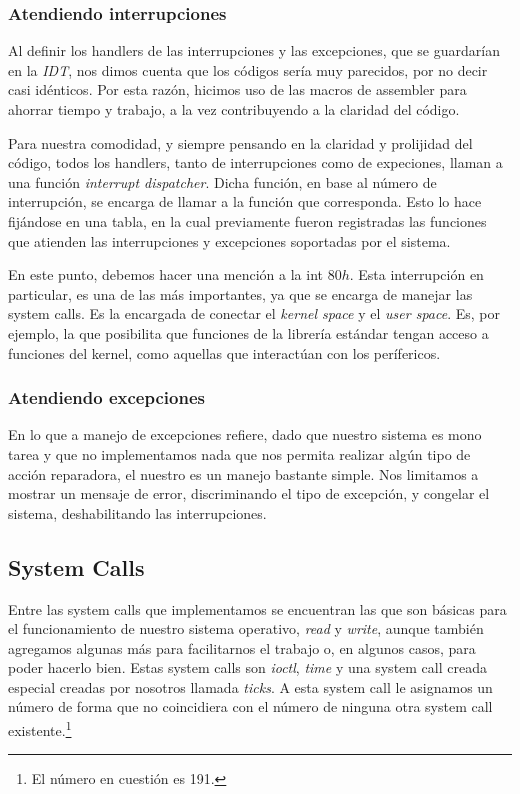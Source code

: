 \documentclass[a4paper,10pt]{article}
\begin{document}
        \subsubsection{Atendiendo interrupciones}
            Al definir los handlers de las interrupciones y las excepciones, que se guardarían en la \textit{IDT}, nos dimos cuenta que los códigos sería muy parecidos,
            por no decir casi idénticos. Por esta razón, hicimos uso de las macros de assembler para ahorrar tiempo y trabajo, a la vez
            contribuyendo a la claridad del código.
            
            Para nuestra comodidad, y siempre pensando en la claridad y prolijidad del código, todos los handlers, tanto de interrupciones
            como de expeciones, llaman a una función \textit{interrupt dispatcher}. Dicha función, en base al número de interrupción, se encarga de llamar
	    a la función que corresponda. Esto lo hace fijándose en una tabla, en la cual previamente fueron registradas las funciones que atienden
	    las interrupciones y excepciones soportadas por el sistema.
	    
	    En este punto, debemos hacer una mención a la int $80h$. Esta interrupción en particular, es una de las más importantes, ya que se encarga de manejar las
	    system calls. Es la encargada de conectar el \textit{kernel space} y el \textit{user space}. Es, por ejemplo, la que posibilita que funciones de la librería
	    estándar tengan acceso a funciones del kernel, como aquellas que interactúan con los perífericos. 
	   
	\subsubsection{Atendiendo excepciones}
	    En lo que a manejo de excepciones refiere, dado que nuestro sistema es mono tarea y que no implementamos nada que nos permita realizar algún tipo de acción 
	    reparadora, el nuestro es un manejo bastante simple. Nos limitamos a mostrar un mensaje de error, discriminando el tipo de excepción, y congelar el sistema,
	    deshabilitando las interrupciones.

    \subsection{System Calls}
	    Entre las system calls que implementamos se encuentran las que son básicas para el funcionamiento de nuestro sistema operativo, \textit{read} y \textit{write},
	    aunque también agregamos algunas más para facilitarnos el trabajo o, en algunos casos, para poder hacerlo bien. Estas system calls son \textit{ioctl}, 
	    \textit{time} y una system call creada especial creadas por nosotros llamada \textit{ticks}. A esta system call le asignamos un número de forma que no 
	    coincidiera con el número de ninguna otra system call existente.\footnote{El número en cuestión es 191.}
	
\end{document}
